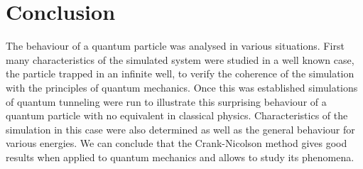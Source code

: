 \section{Conclusion}
The behaviour of a quantum particle was analysed in various situations. First many characteristics of the simulated system were studied in a well known case, the particle trapped in an infinite well, to verify the coherence of the simulation with the principles of quantum mechanics. Once this was established simulations of quantum tunneling were run to illustrate this surprising behaviour of a quantum particle with no equivalent in classical physics. Characteristics of the simulation in this case were also determined as well as the general behaviour for various energies. We can conclude that the Crank-Nicolson method gives good results when applied to quantum mechanics and allows to study its phenomena.

